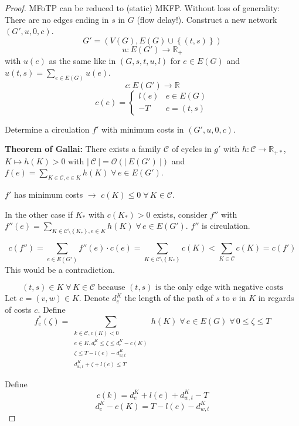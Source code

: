 \documentclass[a4paper]{article}
\theoremstyle{definition}
\newcommand{\card}[1]{\left|\:\!#1\:\!\right|}
\newcommand{\set}[1]{\left\{#1\right\}}
\newcommand{\fall}{\;\forall\,}
\begin{document}
\begin{proof}
  MFoTP can be reduced to (static) MKFP.
  Without loss of generality: There are no edges ending in $s$ in $G$ (flow delay!).
  Construct a new network $(G', u, 0, c)$.
  \[ G' = (V(G), E(G) \cup \set{(t, s)}) \]
  \[ u: E(G') \rightarrow \mathbb{R}_+ \]
  with $u(e)$ as the same like in $(G, s, t, u, l)$ for $e \in E(G)$ and $u(t, s) = \sum_{e \in E(G)} u(e)$.
  \[ c: E(G') \rightarrow \mathbb{R} \]
  \[
    c(e) = \left\{\begin{array}{ll}
      l(e) & e \in E(G) \\
      -T & e = (t, s)
    \end{array}\right.
  \]

  Determine a circulation $f'$ with minimum costs in $(G', u, 0, c)$.

  \textbf{Theorem of Gallai:} There exists a family $\mathcal{C}$ of cycles in $g'$ with $h: \mathcal{C} \rightarrow \mathbb{R}_{+*}$, $K \mapsto h(K) > 0$ with $\card{\mathcal{C}} = \mathcal{O}(\card{E(G')})$ and $f(e) = \sum_{K \in \mathcal{C}, e \in K} h(K) \fall e \in E(G')$.

  $f'$ has minimum costs $\rightarrow$ $c(K) \leq 0 \fall K \in \mathcal{C}$.

  In the other case if $K_*$ with $c(K_*) > 0$ exists, consider $f''$ with $f''(e) = \sum_{K \in \mathcal{C} \setminus \set{K_*}, e \in K} h(K) \fall e \in E(G')$. $f''$ is circulation.

  \[
    c(f'') = \sum_{e \in E(G')} f''(e) \cdot c(e)
      = \sum_{K \in \mathcal{C} \setminus \set{K_*}} c(K)
      < \sum_{K \in \mathcal{C}} c(K)
      = c(f')
  \]
  This would be a contradiction.

  \[
    (t, s) \in K \fall K \in \mathcal{C} \text{ because $(t, s)$ is the only edge with negative costs}
  \]
  Let $e = (v, w) \in K$. Denote $d_e^K$ the length of the path of $s$ to $v$ in $K$ in regards of costs $c$. Define
  \[
    f_e^*(\zeta) =
      \sum_{\substack{
        k \in \mathcal{C}, c(K) < 0 \\
        e \in K, d_e^K \leq \zeta \leq d_e^K - c(K) \\
        \zeta \leq T - l(e) - d_{w,t}^K \\
        d_{w,t}^K + \zeta + l(e) \leq T}}
      h(K)
      \fall e \in E(G) \fall 0 \leq \zeta \leq T
  \]

  Define
  \[ c(k) = d_e^K + l(e) + d_{w,t}^K - T \]
  \[ d_e^K - c(K) = T - l(e) - d_{w,t}^K \]


\end{proof}
\end{document}

